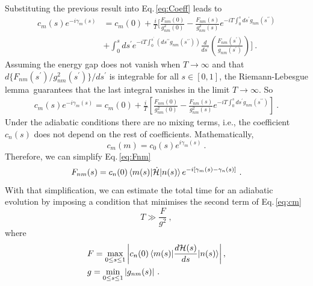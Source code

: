 Substituting the previous result into Eq.\,\eqref{eq:Coeff} leads to
 \begin{equation}
 \begin{split}
      c_{m}(s)e^{-i\gamma_{m}(s)} & = c_{m}(0) + \frac{i}{T}\Biggr[\frac{F_{nm}(0)}{g^{2}_{nm}(0)} - \frac{F_{nm}(s)}{g^{2}_{nm}(s)}e^{-iT\int_{0}^{s}ds^{\prime}g_{nm}(s^{\prime \prime})} \\
      & + \int_{0}^{s}ds^{\prime} e^{-iT\int_{0}^{s^{\prime}}\left(ds^{\prime \prime}g_{nm}(s^{\prime\prime}) \right)} \frac{d}{ds^{\prime}}\left(\frac{F_{nm}(s^{\prime})}{g_{nm}(s^{\prime})}\right)\Biggr]\ .
\end{split}
\end{equation}
 Assuming the energy gap does not vanish when $T \rightarrow \infty$ and that $d\{F_{nm}(s^{\prime})/g_{nm}^{2}(s^{\prime})\}/ds^{\prime}$ is integrable for all $s \in [0,1]$, the Riemann-Lebesgue lemma\,\cite{BrownChurchill} guarantees that the last integral vanishes in the limit $T \rightarrow \infty$. So
  \begin{align}
  \label{eq:cm}
     c_{m}(s)e^{-i\gamma_{m}(s)} = c_{m}(0) + \frac{i}{T}\left[\frac{F_{nm}(0)}{g^{2}_{nm}(0)} - \frac{F_{nm}(s)}{g^{2}_{nm}(s)}e^{-iT\int_{0}^{s}ds^{\prime}g_{nm}(s^{\prime \prime})}\right]\ .
 \end{align}
 Under the adiabatic conditions there are no mixing terms, i.e., the coefficient $c_{n}(s)$ does not depend on the rest of coefficients. Mathematically,
\begin{equation}
    c_{m}(m) = c_{0}(s)e^{i\gamma_{m}(s)}\ .
\end{equation}
Therefore, we can simplify Eq.\,\eqref{eq:Fnm}
\begin{equation}
    F_{nm}(s) = c_{n}(0)\braket{m(s)|\dot{\mathcal{H}}|n(s)} e^{-i\left[\gamma_{m}(s) - \gamma_{n}(s)\right]}\ .
\end{equation}
 With that simplification, we can estimate the total time for an adiabatic evolution by imposing a condition that minimises the second term of Eq.\,\eqref{eq:cm}
 \begin{equation}
     T \gg \frac{F}{g^{2}}\ ,
 \end{equation}
 where
 \begin{align}
     &F = \max_{0 \leq s \leq 1} \left|c_{n}(0)\braket{m(s)|\frac{d\mathcal{H}(s)}{ds}| n(s)}\right|, \\
     &g = \min_{0 \leq s \leq 1} |g_{nm}(s)|\ .
 \end{align}
